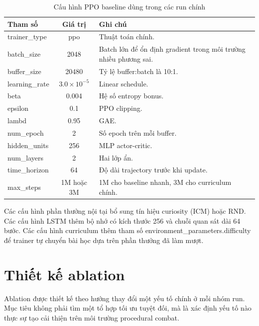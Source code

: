 \begin{table}[H]
    \centering
    \small
    \caption{Cấu hình PPO baseline dùng trong các run chính}
    \label{tab:ppo_baseline_config}
    \begin{tabular}{|p{4cm}|c|p{7cm}|}
        \hline
        \textbf{Tham số} & \textbf{Giá trị} & \textbf{Ghi chú} \\
        \hline
        trainer\_type & ppo & Thuật toán chính. \\
        \hline
        batch\_size & 2048 & Batch lớn để ổn định gradient trong môi trường nhiều phương sai. \\
        \hline
        buffer\_size & 20480 & Tỷ lệ buffer:batch là 10:1. \\
        \hline
        learning\_rate & $3.0 \times 10^{-5}$ & Linear schedule. \\
        \hline
        beta & 0.004 & Hệ số entropy bonus. \\
        \hline
        epsilon & 0.1 & PPO clipping. \\
        \hline
        lambd & 0.95 & GAE. \\
        \hline
        num\_epoch & 2 & Số epoch trên mỗi buffer. \\
        \hline
        hidden\_units & 256 & MLP actor-critic. \\
        \hline
        num\_layers & 2 & Hai lớp ẩn. \\
        \hline
        time\_horizon & 64 & Độ dài trajectory trước khi update. \\
        \hline
        max\_steps & 1M hoặc 3M & 1M cho baseline nhanh, 3M cho curriculum chính. \\
        \hline
    \end{tabular}
\end{table}

Các cấu hình phần thưởng nội tại bổ sung tín hiệu curiosity (ICM) hoặc RND. Các cấu hình LSTM thêm bộ nhớ có kích thước 256 và chuỗi quan sát dài 64 bước. Các cấu hình curriculum thêm tham số environment\_parameters.difficulty để trainer tự chuyển bài học dựa trên phần thưởng đã làm mượt.

\section{Thiết kế ablation}

Ablation được thiết kế theo hướng thay đổi một yếu tố chính ở mỗi nhóm run. Mục tiêu không phải tìm một tổ hợp tối ưu tuyệt đối, mà là xác định yếu tố nào thực sự tạo cải thiện trên môi trường procedural combat.

